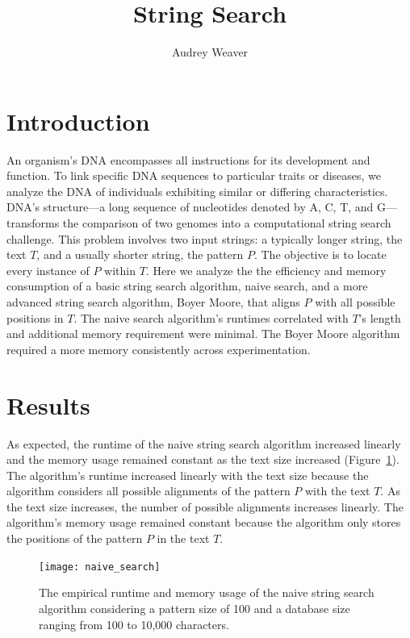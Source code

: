\documentclass[11pt, letterpaper]{article}
\begin{document}
\title{String Search}
\author{Audrey Weaver}
\maketitle

\section{Introduction}
An organism's DNA encompasses all instructions for its development and
function. To link specific DNA sequences to particular traits or diseases, we
analyze the DNA of individuals exhibiting similar or differing characteristics.
DNA's structure—a long sequence of nucleotides denoted by A, C, T, and
G—transforms the comparison of two genomes into a computational string search
challenge. This problem involves two input strings: a typically longer string,
the text $T$, and a usually shorter string, the pattern $P$. The
objective is to locate every instance of $P$ within $T$. Here we analyze the
the efficiency and memory consumption of a basic string search algorithm, 
naive search, and a more advanced string search algorithm, Boyer Moore, that
aligns $P$ with all possible positions in $T$.  The naive search algorithm's
runtimes correlated with $T$'s length and additional memory requirement were
minimal. The Boyer Moore algorithm required a more memory consistently across
experimentation. 

\section{Results}

As expected, the runtime of the naive string search algorithm increased
linearly and the memory usage remained constant as the text size increased
(Figure~\ref{timeandmem}). The algorithm's runtime increased linearly with
the text size because the algorithm considers all possible alignments of the
pattern $P$ with the text $T$. As the text size increases, the number of
possible alignments increases linearly. The algorithm's memory usage remained
constant because the algorithm only stores the positions of the pattern $P$ in
the text $T$.


\begin{figure}[ht] \centering
    \texttt{[image: naive\_search]}
    \caption{The empirical runtime and memory usage of the naive string search
    algorithm considering a pattern size of 100 and a database size ranging
    from 100 to 10,000 characters.}
    \label{timeandmem}
\end{figure}
\end{document}

